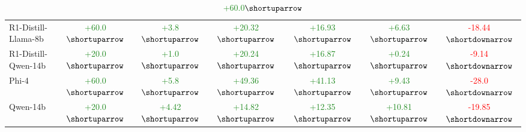 \begin{table}[H]
\begin{tabular}{lcccccc}
    R1-Distill-Llama-8b                                 & \textcolor{ForestGreen}{+60.0$\shortuparrow$}                   & \textcolor{ForestGreen}{+3.8$\shortuparrow$}                   & \textcolor{ForestGreen}{+20.32$\shortuparrow$}                & \textcolor{ForestGreen}{+16.93$\shortuparrow$}                & \textcolor{ForestGreen}{+6.63$\shortuparrow$}              & \textcolor{red}{-18.44$\shortdownarrow$}                \\
    R1-Distill-Qwen-14b                                 & \textcolor{ForestGreen}{+20.0$\shortuparrow$}                   & \textcolor{ForestGreen}{+1.0$\shortuparrow$}                   & \textcolor{ForestGreen}{+20.24$\shortuparrow$}                & \textcolor{ForestGreen}{+16.87$\shortuparrow$}                & \textcolor{ForestGreen}{+0.24$\shortuparrow$}              & \textcolor{red}{-9.14$\shortdownarrow$}                \\
    Phi-4                                               & \textcolor{ForestGreen}{+60.0$\shortuparrow$}                   & \textcolor{ForestGreen}{+5.8$\shortuparrow$}                   & \textcolor{ForestGreen}{+49.36$\shortuparrow$}                & \textcolor{ForestGreen}{+41.13$\shortuparrow$}                & \textcolor{ForestGreen}{+9.43$\shortuparrow$}              & \textcolor{red}{-28.0$\shortdownarrow$}                \\
    Qwen-14b                                            & \textcolor{ForestGreen}{+20.0$\shortuparrow$}                   & \textcolor{ForestGreen}{+4.42$\shortuparrow$}                   & \textcolor{ForestGreen}{+14.82$\shortuparrow$}                & \textcolor{ForestGreen}{+12.35$\shortuparrow$}                & \textcolor{ForestGreen}{+10.81$\shortuparrow$}              & \textcolor{red}{-19.85$\shortdownarrow$}                \\ \hline
    \end{tabular}
    \caption{\textcolor{ForestGreen}{+60.0$\shortuparrow$}}
    \label{tab:\textcolor{ForestGreen}{+3.8$\shortuparrow$}}
    \end{table}
    
